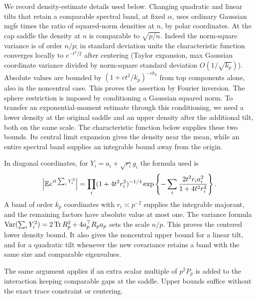 We record density-estimate details used below. Changing quadratic and linear
tilts that retain a comparable spectral band, at fixed \(\alpha\), uses
ordinary Gaussian mgfs times the
ratio of squared-norm densities at \(n\), by polar coordinates. At the cap
saddle the density at \(n\) is comparable to \(\sqrt{p/n}\). Indeed the
norm-square variance is of order \(n/p\); in standard deviation units the
characteristic function converges locally to \(e^{-t^2/2}\) after centering
(Taylor expansion, max Gaussian coordinate variance divided by norm-square
standard deviation \(O(1/\sqrt{k_p})\)). Absolute values are bounded by \((1+c
t^2/k_p)^{-c k_p}\) from top components alone, also in the noncentral case.
This proves the assertion by Fourier inversion. The sphere restriction is
imposed by conditioning a Gaussian squared norm. To transfer an
exponential-moment estimate through this conditioning, we need a lower density
at the original saddle and an upper density after the additional tilt, both on
the same scale. The characteristic function below supplies these two bounds.
Its central limit expansion gives the density near the mean, while an entire
spectral band supplies an integrable bound away from the origin.

In diagonal coordinates, for $Y_i=a_i+\sqrt{r_i}g_i$ the formula used is
\begin{equation}\label{cap:norm-characteristic}
 \left|\mathbb E e^{it\sum_iY_i^2}\right|
 =\prod_i(1+4t^2r_i^2)^{-1/4}
   \exp\left\{-\sum_i\frac{2t^2r_i a_i^2}{1+4t^2r_i^2}\right\}.
\end{equation}
A band of order $k_p$ coordinates with $r_i\asymp p^{-2}$ supplies the
integrable majorant, and the remaining factors have absolute value at most
one. The variance formula $\operatorname{Var}(\sum_iY_i^2)=2\operatorname{Tr}
R_p^2+4a_p^\top R_pa_p$ sets the scale $n/p$. This proves the centered lower
density bound. It also gives the noncentral upper bound for a linear tilt,
and for a quadratic tilt whenever the new covariance retains a band with the
same size and comparable eigenvalues.

The same argument applies if an extra scalar multiple of \(p^2 P_p\) is added
to the interaction keeping comparable gaps at the saddle. Upper bounds suffice
without the exact trace constraint or centering.

